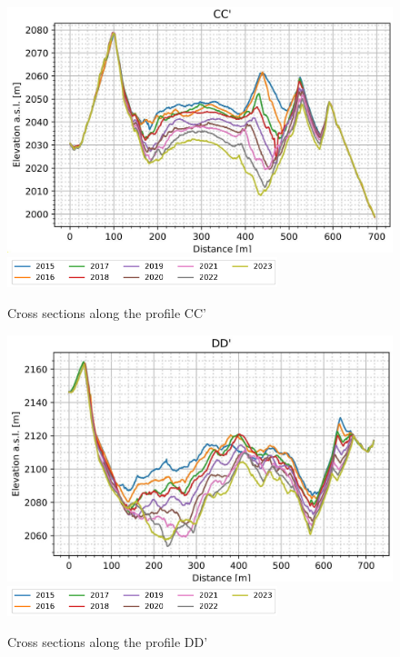 \begin{figure}[p]
    \centering
    \includegraphics[width=\textwidth]{figures/appendix/profile_C.jpg}\\
    \includegraphics[width=0.7\textwidth]{figures/chapter3/profiles_legend.png}
    \caption[]{Cross sections along the profile CC'}
\end{figure}

\begin{figure}[p]
    \centering
    \includegraphics[width=\textwidth]{figures/appendix/profile_D.jpg}\\
    \includegraphics[width=0.7\textwidth]{figures/chapter3/profiles_legend.png}
    \caption[]{Cross sections along the profile DD'}
\end{figure}

